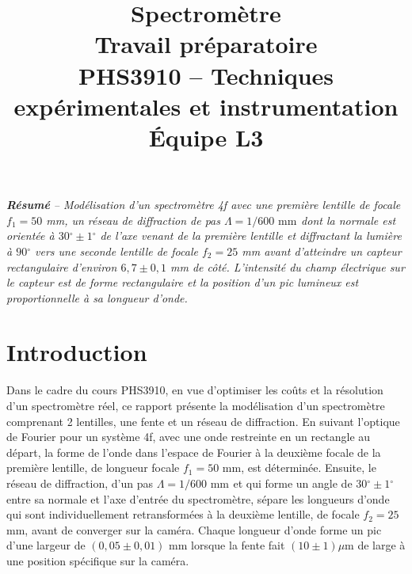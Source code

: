 \documentclass[conference]{IEEEtran}
\begin{document}
\title{Spectromètre\\
\large Travail préparatoire \\
PHS3910 -- Techniques expérimentales et instrumentation\\ 
Équipe L3}

\author{
\and
{}
\and
{}
\and
{}
}

\maketitle

\textit{\textbf{Résumé} -- Modélisation d'un spectromètre 4f avec une première lentille
  de focale $f_1=50$ mm, un réseau de diffraction de pas $\Lambda=1/600\text{ mm}^{}$ dont la normale
est orientée à 
$30{^\circ}\pm 1{^\circ}$ de l'axe venant de la première lentille et diffractant la lumière à 
$90{^\circ}$ vers une seconde lentille de focale $f_2=25$ mm avant d'atteindre un capteur
rectangulaire d'environ $6,7\pm0,1$ mm de côté. L'intensité du champ électrique 
sur le capteur est de forme rectangulaire et la position d'un pic lumineux est 
proportionnelle à sa longueur d'onde.}

\section{Introduction}
Dans le cadre du cours PHS3910, en vue d'optimiser les coûts et la résolution d'un spectromètre réel,
ce rapport présente la modélisation d'un spectromètre comprenant 2 lentilles, une fente et un réseau de diffraction. 
En suivant l'optique de Fourier pour un système 4f, avec une onde restreinte en un rectangle au départ,
la forme de l'onde dans l'espace de Fourier à la deuxième focale de la première
lentille, de longueur focale $f_1=50$ mm, est déterminée. Ensuite, le réseau de diffraction, d'un pas $\Lambda=1/600 \text{ mm}^{}$ 
et qui forme un angle de $30{^\circ}\pm 1{^\circ}$ entre sa normale et
l'axe d'entrée du spectromètre, sépare les longueurs d'onde qui 
sont individuellement retransformées à la deuxième lentille, de focale $f_2=25$ mm, avant de converger sur la caméra.
Chaque longueur d'onde forme un pic d'une largeur de $(0,05\pm 0,01)$ mm lorsque la fente fait $(10 \pm 1) \mu$m
de large à une position spécifique sur la caméra.
\end{document}
